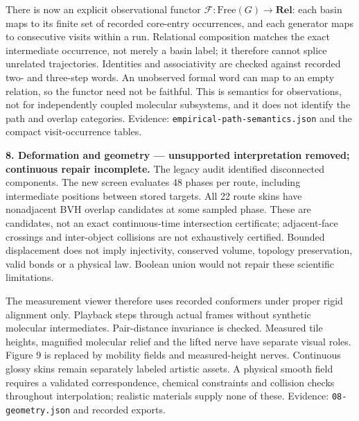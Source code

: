 \documentclass[11pt]{article}
\begin{document}
There is now an explicit observational functor
$\mathcal F:\mathrm{Free}(G)\to\mathbf{Rel}$: each basin maps to its finite
set of recorded core-entry occurrences, and each generator maps to consecutive
visits within a run. Relational composition matches the exact intermediate
occurrence, not merely a basin label; it therefore cannot splice unrelated
trajectories. Identities and associativity are checked against recorded
two- and three-step words. An unobserved formal word can map to an empty
relation, so the functor need not be faithful. This is semantics for observations,
not for independently coupled molecular subsystems, and it does not identify
the path and overlap categories. Evidence: \texttt{empirical-path-semantics.json}
and the compact visit-occurrence tables.

\textbf{8. Deformation and geometry --- unsupported interpretation removed; continuous repair incomplete.}
The legacy audit identified disconnected components. The new screen evaluates
48 phases per route, including intermediate positions between stored targets.
All 22 route skins have nonadjacent BVH overlap candidates at some sampled
phase. These are candidates, not an exact continuous-time intersection
certificate; adjacent-face crossings and inter-object collisions are not
exhaustively certified. Bounded displacement does not imply injectivity,
conserved volume, topology preservation, valid bonds or a physical law.
Boolean union would not repair these scientific limitations.

The measurement viewer therefore uses recorded conformers under proper rigid
alignment only. Playback steps through actual frames without synthetic
molecular intermediates. Pair-distance invariance is checked. Measured tile
heights, magnified molecular relief and the lifted nerve have separate visual
roles. Figure 9 is replaced by mobility fields and measured-height nerves.
Continuous glossy skins remain separately labeled artistic assets.
A physical smooth field requires a validated correspondence, chemical
constraints and collision checks throughout interpolation; realistic materials
supply none of these. Evidence: \texttt{08-geometry.json} and recorded exports.
\end{document}
